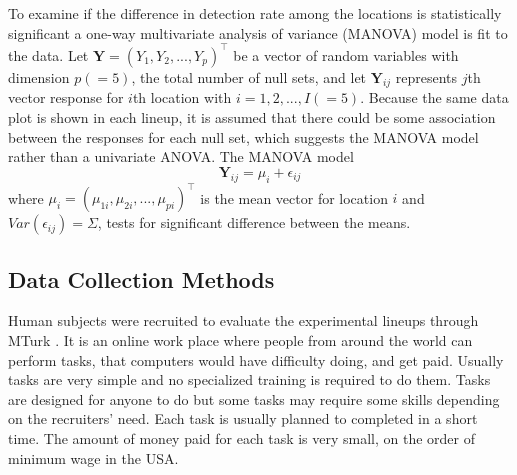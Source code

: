 \documentclass[10pt]{article}\usepackage[]{graphicx}\usepackage[]{color}
\begin{document}
To examine if the difference in detection rate among the locations is statistically significant a one-way multivariate analysis of variance (MANOVA) model is fit to the data.
Let $\mathbf{Y}=(Y_1,Y_2, ... , Y_p)^\top$ be a vector of random variables with dimension $p (=5)$, the total number of null sets, and let $\mathbf{Y}_{ij}$ represents $j$th vector response for $i$th location with $i=1,2, ..., I(=5)$. Because the same data plot is shown in each lineup, it is assumed that there could be some association between the responses for each null set, which suggests the MANOVA model rather than a univariate ANOVA.  The MANOVA model 
\begin{equation}\label{manova}
\mathbf{Y}_{ij} = \mu_{i} + \epsilon_{ij}
\end{equation}
where $\mu_{i}= (\mu_{1i},\mu_{2i}, ..., \mu_{pi})^\top$ is the mean vector for location $i$ and $Var(\epsilon_{ij})=\Sigma$, tests for significant difference between the means. 

\subsection{Data Collection Methods}  Human subjects were recruited to evaluate the experimental lineups through MTurk \citep{turk}.  It is an online work place where people from around the world can perform tasks, that computers would have difficulty doing, and get paid. Usually tasks are very simple and no specialized training is required to do them. Tasks are designed for anyone to do but some tasks may require some skills depending on the recruiters' need. Each task is usually planned to completed in a short time.  The amount of money paid for each task is very small, on the order of minimum wage in the USA. 

\end{document}
